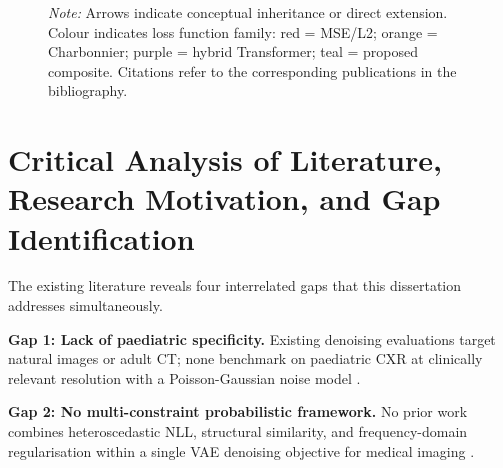 \documentclass[12pt, a4paper, twoside, openright]{book}
\begin{document}
\begin{landscape}
\begin{figure}[H]
{
  } %
   \caption{Evolution of image denoising architectures from classical methods (2007) through to the proposed PP-VAE-Hformer.}
   \label{fig:architecture_evolution}
   \caption*{\footnotesize \textit{Note:} Arrows indicate conceptual inheritance or direct extension. Colour indicates loss function family: red = MSE/L2; orange = Charbonnier; purple = hybrid Transformer; teal = proposed composite. Citations refer to the corresponding publications in the bibliography.}
\end{figure}
\end{landscape}
\section{Critical Analysis of Literature, Research Motivation, and Gap Identification}
\label{sec:intro:gap}

The existing literature reveals four interrelated gaps that this dissertation addresses simultaneously.

\textbf{Gap 1: Lack of paediatric specificity.} Existing denoising evaluations target natural images or adult CT; none benchmark on paediatric CXR at clinically relevant resolution with a Poisson-Gaussian noise model \cite{laborie_scoping_2026, yang_medmnist_2023}.

\textbf{Gap 2: No multi-constraint probabilistic framework.} No prior work combines heteroscedastic NLL, structural similarity, and frequency-domain regularisation within a single VAE denoising objective for medical imaging \cite{bredell_explicitly_2023, zhao_loss_2017}.
\end{document}
